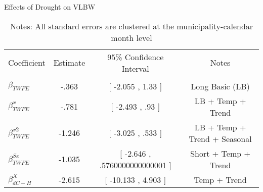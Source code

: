 \begin{table}[!ht]
\centering
\caption{Effects of Drought on VLBW}\label{tab:twfe_vlbw_test}
\renewcommand{\arraystretch}{1.5}
\fontsize{10pt}{12pt}\selectfont
\begin{tabular}{lccc}
\toprule
 \multicolumn{1}{c}{Coefficient}  &\multicolumn{1}{c}{Estimate}&\multicolumn{1}{c}{95\% Confidence Interval}&\multicolumn{1}{c}{Notes}\\\cmidrule(lr){2-2}\cmidrule(lr){3-3}\cmidrule(lr){4-4} \\
\midrule
 $ \beta_{TWFE} $ & -.363  & [ -2.055 ,  1.33 ] & Long Basic (LB) \\
 $ \beta^{x}_{TWFE} $ & -.781  &  [ -2.493 ,  .93  ] & LB + Temp + Trend \\
 $ \beta^{x2}_{TWFE} $ & -1.246  & [ -3.025 ,  .533  ] & LB + Temp + Trend + Seasonal \\
 $ \beta^{Sx}_{TWFE} $ & -1.035  & [ -2.646 ,  .5760000000000001  ] & Short + Temp + Trend \\
 $ \beta^{X}_{dC-H} $ & -2.615  & [ -10.133 ,  4.903 ] & Temp + Trend \\
\bottomrule
\end{tabular}
\caption*{\footnotesize{Notes: All standard errors are clustered at the municipality-calendar month level}}
\end{table}
